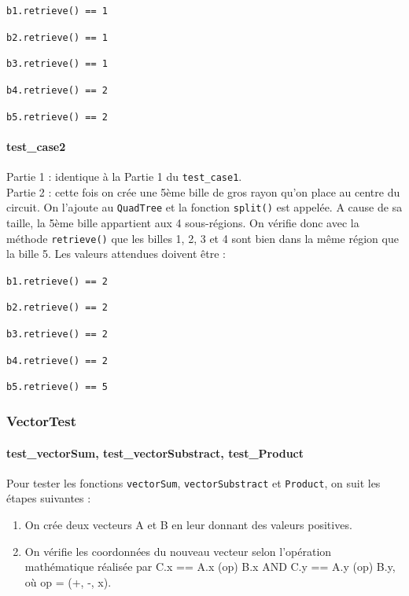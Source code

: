 \documentclass{report}
\begin{document}
\texttt{b1.retrieve() == 1}

\texttt{b2.retrieve() == 1}

\texttt{b3.retrieve() == 1}

\texttt{b4.retrieve() == 2}

\texttt{b5.retrieve() == 2}

\paragraph{test\_case2}

Partie 1 : identique à la Partie 1 du \texttt{test\_case1}. \\

Partie 2 : cette fois on crée une 5ème bille de gros rayon qu’on place au centre du circuit. On l’ajoute au \texttt{QuadTree} et la fonction \texttt{split()} est appelée. A cause de sa taille, la 5ème bille appartient aux 4 sous-régions. On vérifie donc avec la méthode \texttt{retrieve()} que les billes 1, 2, 3 et 4 sont bien dans la même région que la bille 5. Les valeurs attendues doivent être :

\texttt{b1.retrieve() == 2}

\texttt{b2.retrieve() == 2}

\texttt{b3.retrieve() == 2}

\texttt{b4.retrieve() == 2}

\texttt{b5.retrieve() == 5}

\subsubsection{VectorTest}

\paragraph{test\_vectorSum, test\_vectorSubstract, test\_Product}

Pour tester les fonctions \texttt{vectorSum}, \texttt{vectorSubstract} et \texttt{Product}, on suit les étapes suivantes :

\begin{enumerate}
\item On crée deux vecteurs A et B en leur donnant des valeurs positives.
\item On vérifie les coordonnées du nouveau vecteur selon l’opération mathématique réalisée par C.x == A.x (op) B.x AND C.y == A.y (op) B.y, où op = (+, -, x).
\end{enumerate}
\end{document}
